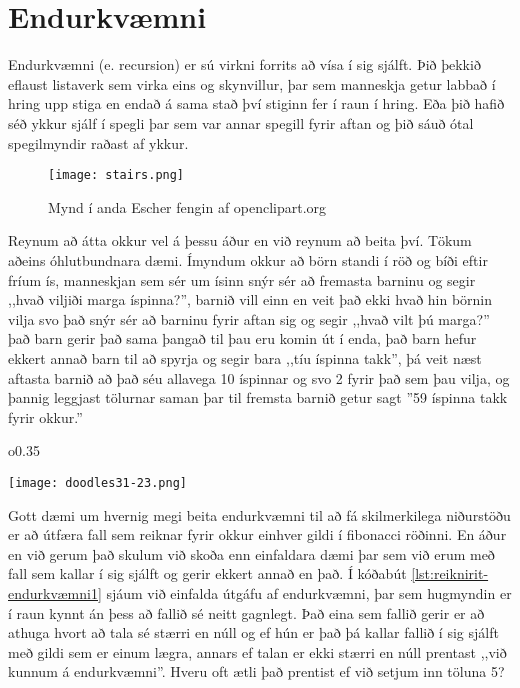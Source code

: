 \section{Endurkvæmni}\label{uk:reiknirit-endurkvæmni}
Endurkvæmni (e. recursion) er sú virkni forrits að vísa í sig sjálft.
Þið þekkið eflaust listaverk sem virka eins og skynvillur, þar sem manneskja getur labbað í hring upp stiga en endað á sama stað því stiginn fer í raun í hring. 
Eða þið hafið séð ykkur sjálf í spegli þar sem var annar spegill fyrir aftan og þið sáuð ótal spegilmyndir raðast af ykkur.
\begin{figure}[h]
	\centering
	\texttt{[image: stairs.png]}
	\caption{Mynd í anda Escher fengin af openclipart.org}
	\label{fig: Escher}
\end{figure}

Reynum að átta okkur vel á þessu áður en við reynum að beita því.
Tökum aðeins óhlutbundnara dæmi.
Ímyndum okkur að börn standi í röð og bíði eftir fríum ís, manneskjan sem sér um ísinn snýr sér að fremasta barninu og segir ,,hvað viljiði marga íspinna?'', barnið vill einn en veit það ekki hvað hin börnin vilja svo það snýr sér að barninu fyrir aftan sig og segir ,,hvað vilt þú marga?'' það barn gerir það sama þangað til þau eru komin út í enda, það barn hefur ekkert annað barn til að spyrja og segir bara ,,tíu íspinna takk'', þá veit næst aftasta barnið að það séu allavega 10 íspinnar og svo 2 fyrir það sem þau vilja, og þannig leggjast tölurnar saman þar til fremsta barnið getur sagt ''59 íspinna takk fyrir okkur.''


\begin{wrapfigure}{o}{0.35\textwidth} %
	\begin{center}
		\texttt{[image: doodles31-23.png]}
	\end{center}
\end{wrapfigure}
Gott dæmi um hvernig megi beita endurkvæmni til að fá skilmerkilega niðurstöðu er að útfæra fall sem reiknar fyrir okkur einhver gildi í fibonacci röðinni.
En áður en við gerum það skulum við skoða enn einfaldara dæmi þar sem við erum með fall sem kallar í sig sjálft og gerir ekkert annað en það.
Í kóðabút \ref{lst:reiknirit-endurkvæmni1} sjáum við einfalda útgáfu af endurkvæmni, þar sem hugmyndin er í raun kynnt án þess að fallið sé neitt gagnlegt.
Það eina sem fallið gerir er að athuga hvort að tala sé stærri en núll og ef hún er það þá kallar fallið í sig sjálft með gildi sem er einum lægra, annars ef talan er ekki stærri en núll prentast ,,við kunnum á endurkvæmni''.
Hveru oft ætli það prentist ef við setjum inn töluna 5?

